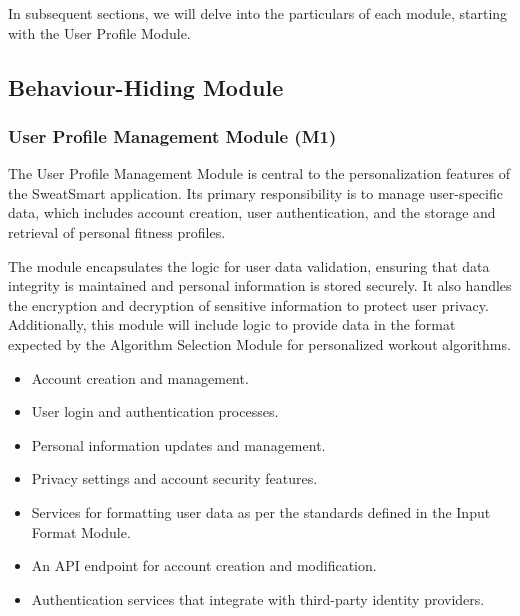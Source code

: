 \documentclass[12pt, titlepage]{article}
\begin{document}
In subsequent sections, we will delve into the particulars of each module, starting with the User Profile Module.

\subsection{Behaviour-Hiding Module}

\subsubsection{User Profile Management Module (M1)}

The User Profile Management Module is central to the personalization features of the SweatSmart application. Its primary responsibility is to manage user-specific data, which includes account creation, user authentication, and the storage and retrieval of personal fitness profiles.

\begin{description}[leftmargin=0pt]
\item[Secrets:] 
The module encapsulates the logic for user data validation, ensuring that data integrity is maintained and personal information is stored securely. It also handles the encryption and decryption of sensitive information to protect user privacy. Additionally, this module will include logic to provide data in the format expected by the Algorithm Selection Module for personalized workout algorithms.
\end{description}

\begin{description}[leftmargin=0pt] %
\item[Services:] 
\end{description}
\begin{itemize}[leftmargin=*]
\item Account creation and management.
\item User login and authentication processes.
\item Personal information updates and management.
\item Privacy settings and account security features.
\item Services for formatting user data as per the standards defined in the Input Format Module.
\end{itemize}

\begin{description}[leftmargin=0pt]
\item[Interfaces:] 
\end{description}
\begin{itemize}[leftmargin=*]
\item An API endpoint for account creation and modification.
\item Authentication services that integrate with third-party identity providers.
\end{itemize}
\end{document}

